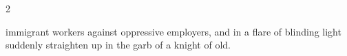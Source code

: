 \begin{multicols}{2}

immigrant workers against oppressive employers, and in a flare of blinding light suddenly straighten up in the garb of a knight of old. 





\end{multicols}
